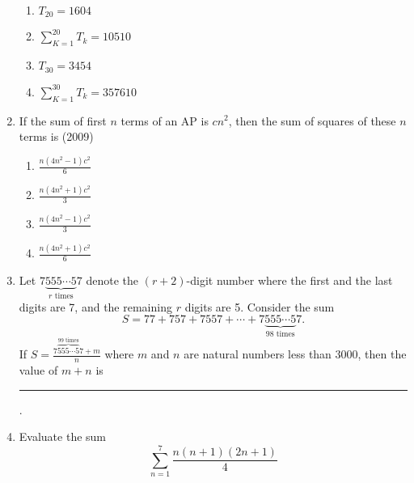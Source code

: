 \begin{enumerate}[label=\thesubsection.\arabic*,ref=\thesubsection.\theenumi]
	\hfill {}
		\begin{multicols}{2}
\begin{enumerate}
\item     $T_{20} =1604$  
\item    $\sum_{K=1}^{20}T_k=10510$
\item     $T_{30}=3454$ 
\item     $\sum_{K=1}^{30}T_k=357610$  
\end{enumerate}
                                         \end{multicols} 
\item If the sum of first $n$ terms of an AP is $cn^2$,  then the sum of squares of these $n$ terms is \hfill(2009)
%                
%            
             \begin{multicols}{4}
\begin{enumerate}    
                    \item $\frac{n(4n^2-1)c^2}{6}$
                    \item $\frac{n(4n^2+1)c^2}{3}$
                    \item $\frac{n(4n^2-1)c^2}{3}$
                    \item $\frac{n(4n^2+1)c^2}{6}$
		\end{enumerate}
         \end{multicols}
%  
\item  Let $ {7\underbrace{555\cdots5}_{r \text{ times}}7} $ denote the \( (r+2) \)-digit number where the first and the last digits are 7, and the remaining \( r \) digits are 5. Consider the sum $$S =77 + 757 + 7557 + \cdots + 7\underbrace{555\cdots5}_{98 \text{ times}}7.$$ If $ S = \frac{7\overbrace{555\cdots5}^{99 \text{ times}}7+m}{n} $ where \( m \) and \( n \) are natural numbers less than 3000, then the value of \( m + n \) is \rule{1cm}{0.1pt}.
	\hfill {}
\item Evaluate the sum
\[
\sum_{n=1}^{7} \frac{n(n + 1)(2n + 1)}{4}
\]

\hfill{}
\end{enumerate}
